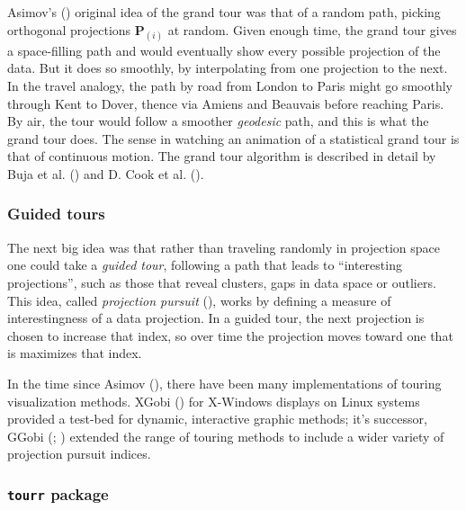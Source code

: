 \documentclass[
  letterpaper,
  10pt,
  krantz2]{krantz}
\begin{document}
{\begin{figure}
\end{figure}%

Asimov's () original idea of the grand
tour was that of a random path, picking orthogonal projections
\(\mathbf{P}_{(i)}\) at random. Given enough time, the grand tour gives
a space-filling path and would eventually show every possible projection
of the data. But it does so smoothly, by interpolating from one
projection to the next. In the travel analogy, the path by road from
London to Paris might go smoothly through Kent to Dover, thence via
Amiens and Beauvais before reaching Paris. By air, the tour would follow
a smoother \emph{geodesic} path, and this is what the grand tour does.
The sense in watching an animation of a statistical grand tour is that
of continuous motion. The grand tour algorithm is described in detail by
Buja et al. () and D. Cook et al.
().

\subsubsection{Guided tours}\label{guided-tours}

The next big idea was that rather than traveling randomly in projection
space one could take a \emph{guided tour}, following a path that leads
to ``interesting projections'', such as those that reveal clusters, gaps
in data space or outliers. This idea, called \emph{projection pursuit}
(), works by defining
a measure of interestingness of a data projection. In a guided tour, the
next projection is chosen to increase that index, so over time the
projection moves toward one that is maximizes that index.

In the time since Asimov (), there have
been many implementations of touring visualization methods. XGobi
() for X-Windows
displays on Linux systems provided a test-bed for dynamic, interactive
graphic methods; it's successor, GGobi
(;
) extended the range
of touring methods to include a wider variety of projection pursuit
indices.

\subsubsection{\texorpdfstring{\texttt{tourr}
package}{tourr package}}\label{tourr-package}

}
\end{document}

